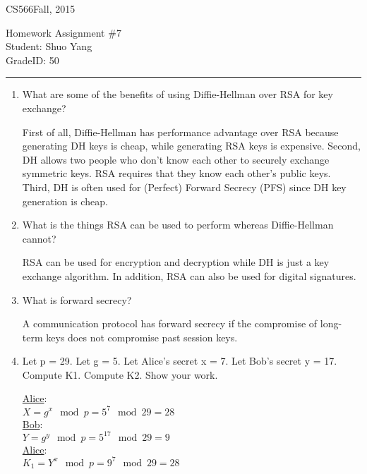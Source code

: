 \documentclass[11pt]{article}
\def\CourseCode{CS566}
\def\AssignmentNo{7}
\def\DateHandedOut{Fall, 2015}
\def\Author{Shuo Yang}
\def\GradeID{50}
\begin{document}
\noindent

\CourseCode \hfill \DateHandedOut

\begin{center}
Homework Assignment \#\AssignmentNo\\
Student: \Author\\
GradeID: \GradeID\\
\end{center}

\hrule\smallskip

\vspace{1.5em}

\begin{enumerate}
\item What are some of the benefits of using Diffie-Hellman over RSA
  for key exchange?

First of all, Diffie-Hellman has performance advantage over RSA
because generating DH keys is cheap, while generating RSA keys is
expensive. Second, DH allows two people who don't know each other to
securely exchange symmetric keys. RSA requires that they know each
other’s public keys. Third, DH is often used for (Perfect) Forward
Secrecy (PFS) since DH key generation is cheap.

\item What is the things RSA can be used to perform whereas
  Diffie-Hellman cannot?

RSA can be used for encryption and decryption while DH is just a key
exchange algorithm. In addition, RSA can also be used for digital
signatures.

\item What is forward secrecy?

A communication protocol has forward secrecy if the compromise of
long-term keys does not compromise past session keys.

\item Let p = 29. Let g = 5. Let Alice’s secret x = 7. Let Bob’s
  secret y = 17. Compute K1. Compute K2. Show your work.

\underline{Alice}:\\
$X = g^x \mod p = 5^7 \mod 29 = 28$\\

\underline{Bob}:\\
$Y = g^y \mod p = 5^{17} \mod 29 = 9$\\

\underline{Alice}:\\
$K_1 = Y^x \mod p = 9^7 \mod 29 = 28$\\


\end{enumerate}
\end{document}
